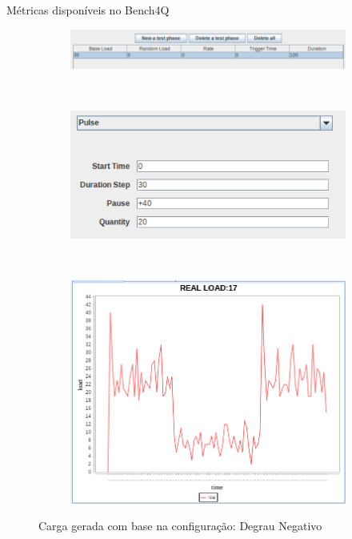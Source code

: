 \begin{frame}{Métricas disponíveis no Bench4Q}
	\begin{figure}[!htb]
		\begin{subfigure}{\linewidth}
			\centering
			\includegraphics[scale=0.35]{../monograph/images/condiguracao-carga-bench4q2.png}
			\label{fig:condiguracao-carga-bench4q2}
		\end{subfigure}\\
		\begin{subfigure}{\linewidth}
			\centering
			\includegraphics[scale=0.35]{../monograph/images/condiguracao-carga-modulada2.png}
			\label{fig:condiguracao-carga-modulada2}
		\end{subfigure}\\[1ex]
		\begin{subfigure}{\linewidth}
			\centering
			\includegraphics[scale=0.3]{../monograph/images/grafico-carga-modulada2.png}
			\label{fig:grafico-carga-modulada2}
		\end{subfigure}
		\caption{Carga gerada com base na configuração: Degrau Negativo}
		\label{fig:carga-modulada2}
	\end{figure}
\end{frame}


